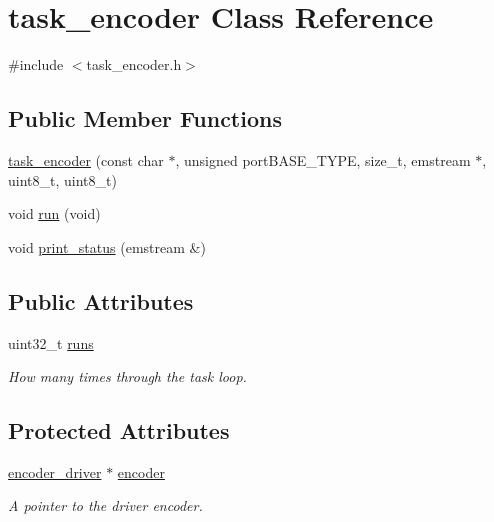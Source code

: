 \hypertarget{classtask__encoder}{\section{task\-\_\-encoder \-Class \-Reference}
\label{classtask__encoder}
}


{\ttfamily \#include $<$task\-\_\-encoder.\-h$>$}

\subsection*{\-Public \-Member \-Functions}
\begin{DoxyCompactItemize}
\item 
\hyperlink{classtask__encoder_a86aac760167b1b7d59840270a9365711}{task\-\_\-encoder} (const char $\ast$, unsigned port\-B\-A\-S\-E\-\_\-\-T\-Y\-P\-E, size\-\_\-t, emstream $\ast$, uint8\-\_\-t, uint8\-\_\-t)
\item 
void \hyperlink{classtask__encoder_a8380b1f111bf5d6b4256f16e355c0afc}{run} (void)
\item 
void \hyperlink{classtask__encoder_a5006f06f253b70cfec10065d67e52ec6}{print\-\_\-status} (emstream \&)
\end{DoxyCompactItemize}
\subsection*{\-Public \-Attributes}
\begin{DoxyCompactItemize}
\item 
\hypertarget{classtask__encoder_a1730c64a9c2fb9eacf549929071ab2c5}{uint32\-\_\-t \hyperlink{classtask__encoder_a1730c64a9c2fb9eacf549929071ab2c5}{runs}}\label{classtask__encoder_a1730c64a9c2fb9eacf549929071ab2c5}

\begin{DoxyCompactList}\small\item\em \-How many times through the task loop. \end{DoxyCompactList}\end{DoxyCompactItemize}
\subsection*{\-Protected \-Attributes}
\begin{DoxyCompactItemize}
\item 
\hypertarget{classtask__encoder_ac6a3245667614f1ffab6fd035bb89144}{\hyperlink{classencoder__driver}{encoder\-\_\-driver} $\ast$ \hyperlink{classtask__encoder_ac6a3245667614f1ffab6fd035bb89144}{encoder}}\label{classtask__encoder_ac6a3245667614f1ffab6fd035bb89144}

\begin{DoxyCompactList}\small\item\em \-A pointer to the driver encoder. \end{DoxyCompactList}\end{DoxyCompactItemize}


